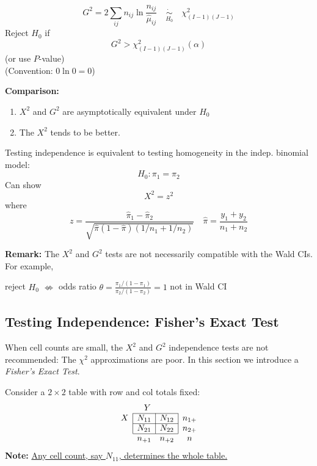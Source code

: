 \documentclass[11pt]{elegantbook}
\begin{document}
\begin{definition}
    $$G^2=2\sum_{i j}n_{ij} \ln \frac{n_{i j}}{\hat{\mu}_{i j}} \quad \underset{H_0}{\dot{\sim}}\quad \chi_{(I-1)(J-1)}^2$$
    Reject $H_0$ if
    $$G^2>\chi_{(I-1)(J-1)}^2(\alpha)$$
    (or use $P$-value)\\
    (Convention: $0 \ln 0 = 0$)
\end{definition}
\textbf{Comparison:}
\begin{enumerate}
    \item $X^2$ and $G^2$ are asymptotically equivalent under $H_0$
    \item The $X^2$ tends to be better.
\end{enumerate}
\begin{example}
    Testing independence is equivalent to testing homogeneity in the indep. binomial model:
    $$
    H_0: \pi_1=\pi_2
    $$
    Can show
    $$
    X^2=z^2
    $$
    where
    $$
    z=\frac{\hat{\pi}_1-\hat{\pi}_2}{\sqrt{\hat{\pi}(1-\hat{\pi})\left(1 / n_1+1 / n_2\right)}} \quad \hat{\pi}=\frac{y_1+y_2}{n_1+n_2}
    $$
\end{example}
\textbf{Remark:} The $X^2$ and $G^2$ tests are not necessarily compatible with the Wald CIs. For example,
\begin{center}
    reject $H_0$ $\nLeftrightarrow$  odds ratio $\theta =\frac{\pi_1/(1-\pi_1)}{\pi_2/(1-\pi_2)}= 1$ not in Wald CI
\end{center}

\subsection{Testing Independence: Fisher's Exact Test}
When cell counts are small, the $X^2$ and $G^2$ independence tests are not recommended: The $\chi^2$ approximations are poor. In this section we introduce a \textit{Fisher's Exact Test}.

Consider a $2 \times 2$ table with row and col totals fixed:
$$
\begin{array}{c|c|c|c}
\multicolumn{3}{c}{Y} \\
\cline { 2 - 3 } X & N_{11} & N_{12} & n_{1+} \\
\cline { 2 - 3 } & N_{21} & N_{22} & n_{2+} \\
\cline { 2 - 3 } \multicolumn{1}{c}{}&\multicolumn{1}{c}{n_{+1}}&\multicolumn{1}{c}{n_{+2}}&\multicolumn{1}{c}{n}
\end{array}
$$
\textbf{Note:} \underline{Any cell count, say $N_{11}$, determines the whole table.}
\end{document}

